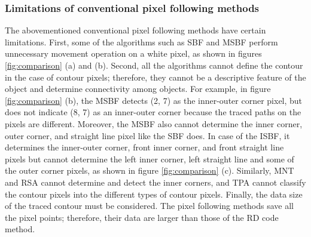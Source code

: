 \subsubsection{Limitations of conventional pixel following methods}
The abovementioned conventional pixel following methods have certain limitations. First, some of the algorithms such as SBF and MSBF perform unnecessary movement operation on a white pixel, as shown in figures \ref{fig:comparison} (a) and (b). Second, all the algorithms cannot define the contour in the case of contour pixels; therefore, they cannot be a descriptive feature of the object and determine connectivity among objects. For example, in figure \ref{fig:comparison} (b), the MSBF detects (2, 7) as the inner-outer corner pixel, but does not indicate (8, 7) as an inner-outer corner because the traced paths on the pixels are different. Moreover, the MSBF also cannot determine the inner corner, outer corner, and straight line pixel like the SBF does. In case of the ISBF, it determines the inner-outer corner, front inner corner, and front straight line pixels but cannot determine the left inner corner, left straight line and some of the outer corner pixels, as shown in figure \ref{fig:comparison} (c). Similarly, MNT and RSA cannot determine and detect the inner corners, and TPA cannot classify the contour pixels into the different types of contour pixels. Finally, the data size of the traced contour must be considered. The pixel following methods save all the pixel points; therefore, their data are larger than those of the RD code method.


